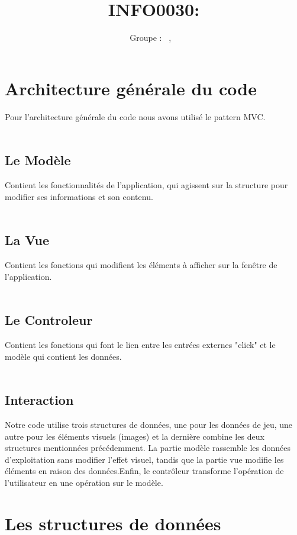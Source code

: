\documentclass[a4paper, 11pt, oneside]{article}
\title{INFO0030: \intitule}
\author{Groupe \GrNbr : \PrenomUN~\textsc{\NomUN}, \PrenomDEUX~\textsc{\NomDEUX}}
\date{}
\begin{document}
\maketitle
\newpage
\tableofcontents
\newpage

\section{Architecture générale du code}
Pour l'architecture générale du code nous avons utilisé le pattern MVC.\\ \\
\subsection{Le Modèle}
Contient les fonctionnalités de l'application, qui agissent sur la structure pour modifier ses informations et son contenu.
\\ \\
\subsection{La Vue}
Contient les fonctions qui modifient les éléments à afficher sur la fenêtre de l'application.
\\ \\
\subsection{Le Controleur}
Contient les fonctions qui font le lien entre les entrées externes "click" et le modèle qui contient les données.
\\ \\
\subsection{Interaction}
Notre code utilise trois structures de données, une pour les données de jeu, une autre pour les éléments visuels (images) et la dernière combine les deux structures mentionnées précédemment.
La partie modèle rassemble les données d'exploitation sans modifier l'effet visuel, tandis que la partie vue modifie les éléments en raison des données.Enfin, le contrôleur transforme l'opération de l'utilisateur en une opération sur le modèle.
\newpage
\section{Les structures de données}
\end{document}
